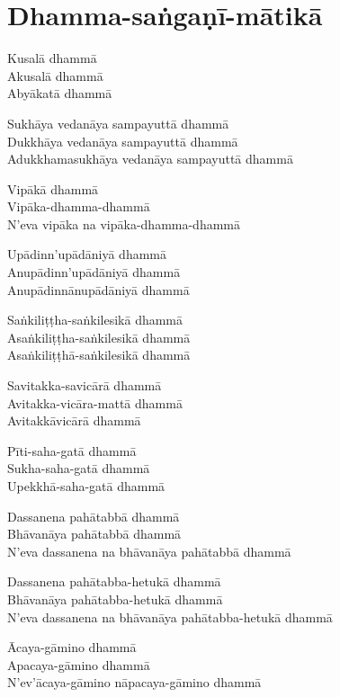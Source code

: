 
\chapter{Dhamma-saṅgaṇī-mātikā}%


\begin{paritta}
Kusalā dhammā\\
Akusalā dhammā\\
Abyākatā dhammā

Sukhāya vedanāya sampayuttā dhammā\\
Dukkhāya vedanāya sampayuttā dhammā\\
Adukkhamasukhāya vedanāya sampayuttā dhammā

Vipākā dhammā\\
Vipāka-dhamma-dhammā\\
N'eva vipāka na vipāka-dhamma-dhammā

Upādinn'upādāniyā dhammā\\
Anupādinn'upādāniyā dhammā\\
Anupādinnānupādāniyā dhammā

Saṅkiliṭṭha-saṅkilesikā dhammā\\
Asaṅkiliṭṭha-saṅkilesikā dhammā\\
Asaṅkiliṭṭhā-saṅkilesikā dhammā

Savitakka-savicārā dhammā\\
Avitakka-vicāra-mattā dhammā\\
Avitakkāvicārā dhammā

Pīti-saha-gatā dhammā\\
Sukha-saha-gatā dhammā\\
Upekkhā-saha-gatā dhammā

\enlargethispage{\baselineskip}

Dassanena pahātabbā dhammā\\
Bhāvanāya pahātabbā dhammā\\
N'eva dassanena na bhāvanāya pahātabbā dhammā

\clearpage

Dassanena pahātabba-hetukā dhammā\\
Bhāvanāya pahātabba-hetukā dhammā\\
N'eva dassanena na bhāvanāya pahātabba-hetukā dhammā

Ācaya-gāmino dhammā\\
Apacaya-gāmino dhammā\\
N'ev'ācaya-gāmino nāpacaya-gāmino dhammā


\end{paritta}
